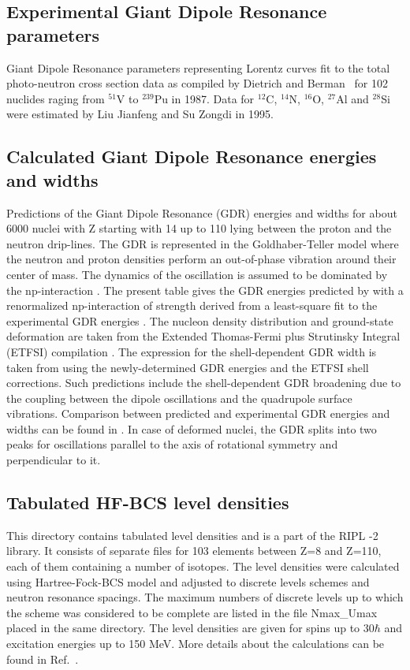 \subsection{Experimental Giant Dipole Resonance parameters}

Giant Dipole Resonance parameters representing Lorentz curves fit to the
total photo-neutron cross section data as compiled by Dietrich and Berman~%
\cite{die88} for 102 nuclides raging from $^{51}$V to $^{239}$Pu in 1987.
Data for $^{12}$C, $^{14}$N, $^{16}$O, $^{27}$Al and $^{28}$Si were
estimated by Liu Jianfeng and Su Zongdi in 1995.

\subsection{Calculated Giant Dipole Resonance energies and widths}

Predictions of the Giant Dipole Resonance (GDR) energies and widths for
about 6000 nuclei with Z starting with 14 up to 110 lying between the proton
and the neutron drip-lines. The GDR is represented in the Goldhaber-Teller
model \cite{Goldhaber48} where the neutron and proton densities perform an
out-of-phase vibration around their center of mass. The dynamics of the
oscillation is assumed to be dominated by the np-interaction \cite{Isacker92}%
. The present table gives the GDR energies predicted by \cite{Isacker92}
with a renormalized np-interaction of strength derived from a least-square
fit to the experimental GDR energies \cite{Goriely98}. The nucleon density
distribution and ground-state deformation are taken from the Extended
Thomas-Fermi plus Strutinsky Integral (ETFSI) compilation \cite%
{Goriely2000,Aboussir95}. The expression for the shell-dependent GDR width
is taken from \cite{Thielemann1983} using the newly-determined GDR energies
and the ETFSI shell corrections. Such predictions include the
shell-dependent GDR broadening due to the coupling between the dipole
oscillations and the quadrupole surface vibrations. Comparison between
predicted and experimental GDR energies and widths can be found in \cite%
{Goriely98}. In case of deformed nuclei, the GDR splits into two peaks for
oscillations parallel to the axis of rotational symmetry and perpendicular
to it.

\subsection{Tabulated HF-BCS level densities}

This directory contains tabulated level densities%
 and is a part of the RIPL%
-2 library. It consists of separate files for 103 elements
between Z=8 and Z=110, each of them containing a number of isotopes. The
level densities were calculated using Hartree-Fock-BCS model and adjusted to
discrete levels schemes and neutron resonance spacings. The maximum numbers
of discrete levels up to which the scheme was considered to be complete are
listed in the file Nmax\_Umax placed in the same directory. The level
densities are given for spins up to 30$\hbar$ and excitation energies up to
150 MeV. More details about the calculations can be found in Ref.~\cite%
{HFBCS}.

